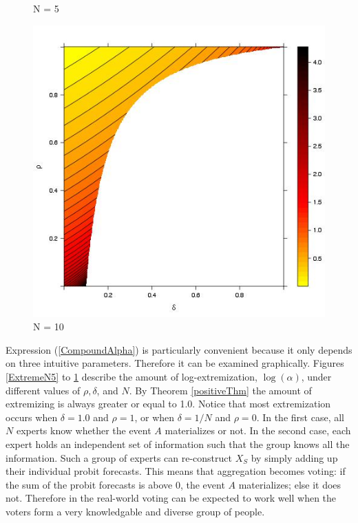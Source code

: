 \documentclass[11pt,twoside]{article}
\begin{document}
\begin{figure}[hbt!]
\begin{minipage}[t]{0.33\textwidth}
\caption{N = 5}
\label{ExtremeN10}
\end{minipage}
\begin{minipage}[t]{0.33\textwidth}
\centering
\includegraphics[width=\textwidth, height = \textwidth]{ExtremeN10.jpeg}
\caption{N = 10}
\label{ExtremeN30}
\end{minipage}
\end{figure}

Expression (\ref{CompoundAlpha}) is particularly convenient because it only depends on three intuitive parameters. Therefore it can be examined graphically. Figures \ref{ExtremeN5} to \ref{ExtremeN30} describe the amount of log-extremization, $\log(\alpha)$, under different values of $\rho, \delta$, and $N$. By Theorem \ref{positiveThm} the amount of extremizing is always greater or equal to 1.0. Notice that most extremization occurs when $\delta = 1.0$ and $\rho = 1$, or when  $\delta = 1/N$ and $\rho = 0$. In the first case, all $N$ experts know whether the event $A$ materializes or not. In the second case, each expert holds an independent set of information such that the group knows all the information. Such a group of experts can re-construct $X_S$ by simply adding up their individual probit forecasts. This means that aggregation becomes voting: if the sum of the probit forecasts is above 0, the event $A$ materializes; else it does not. Therefore in the real-world voting can be expected to work well when the voters form a very knowledgable and diverse group of people. 
\end{document}
